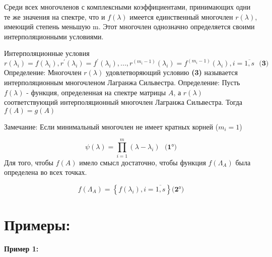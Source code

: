 \documentclass{article}
\begin{document}
Среди всех многочленов с комплексными коэффициентами, принимающих одни те же значения на спектре, что и \(f(\lambda)\) имеется единственный многочлен \(r(\lambda)\), имеющий степень меньшую m. Этот многочлен однозначно определяется своими интерполяционными условиями. \newline

Интерполяционные условия
\[r(\lambda_{i}) = f(\lambda_{i}), r^{'}(\lambda_{i}) = f^{'}(\lambda_{i}) ,...,  r^{(m_{i}-1)}(\lambda_{i}) = f^{(m_{i}-1)}(\lambda_{i}), i = \overline{1, s}\text{ } \textbf{(3)}\]
Определение: \newline
  Многочлен \(  r(\lambda)\) удовлетворяющий условию \textbf{(3)} называется интерполяционным многочленом Лагранжа  Сильвестра.\newline\newline
Определение:\newline
    Пусть \(f(\lambda)\) - функция, определенная на спектре матрицы \(A\), а \(r(\lambda)\) соответствующий интерполяционный многочлен Лагранжа Сильвестра. \newline
    Тогда  \(f(A) = g(A)\) \newline

Замечание:\newline
    Если минимальный многочлен не имеет кратных корней (\(m_{i} = 1\))\newline
    
\[\psi(\lambda) = \prod_{i=1}^{m} (\lambda - \lambda_{i}) \text{ } \textbf{(1°)}\]
\newline
    Для того, чтобы \(f(A)\) имело смысл достаточно, чтобы функция \(f(\Lambda_{A})\) была определена во всех точках. \newline
    
\[f(\Lambda_{A})  = \left\{ f(\lambda_{i}), i = \overline{1,s}\right\} \textbf{(2°)}\]

\section{Примеры:}
\textbf{Пример 1:}\newline
    
\end{document}
